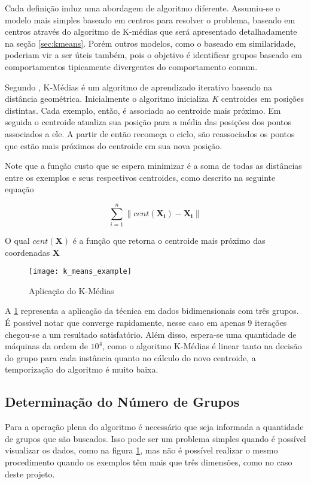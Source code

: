 Cada definição induz uma abordagem de algoritmo diferente. Assumiu-se o modelo mais simples baseado em centros para resolver o problema, baseado em centros através do algoritmo de K-médias que será apresentado detalhadamente na seção \ref{sec:kmeans}. Porém outros modelos, como o baseado em similaridade, poderiam vir a ser úteis também, pois o objetivo é identificar grupos baseado em comportamentos tipicamente divergentes do comportamento comum.

Segundo \citet{witten2011data}, K-Médias é um algoritmo de aprendizado iterativo baseado na distância geométrica. Inicialmente o algoritmo inicializa \textit{K} centroides em posições distintas. Cada exemplo, então, é associado ao centroide mais próximo. Em seguida o centroide atualiza sua posição para a média das posições dos pontos associados a ele. A partir de então recomeça o ciclo, são reassociados os pontos que estão mais próximos do centroide em sua nova posição.

Note que a função custo que se espera minimizar é a soma de todas as distâncias entre os exemplos e seus respectivos centroides, como descrito na seguinte equação

\[
\sum_{i=1}^{n} \lVert cent(\mathbf{X_{i}}) - \mathbf{X_{i}} \rVert
\]

O qual \(cent(\mathbf{X})\) é a função que retorna o centroide mais próximo das coordenadas \(\mathbf{X}\)

\begin{figure}
\texttt{[image: k\_means\_example]}
\caption[Aplicação do K-Médias]{Aplicação do K-Médias} \label{fig:k_means_example}
\end{figure}

A \ref{fig:k_means_example} representa a aplicação da técnica em dados bidimensionais com três grupos. É possível notar que converge rapidamente, nesse caso em apenas 9 iterações chegou-se a um resultado satisfatório. Além disso, espera-se uma quantidade de máquinas da ordem de \(10^4\), como o algoritmo K-Médias é linear tanto na decisão do grupo para cada instância quanto no cálculo do novo centroide, a temporização do algoritmo é muito baixa.

\subsection{Determinação do Número de Grupos}

Para a operação plena do algoritmo é necessário que seja informada a quantidade de grupos que são buscados. Isso pode ser um problema simples quando é possível visualizar os dados, como na figura \ref{fig:k_means_example}, mas não é possível realizar o mesmo procedimento quando os exemplos têm mais que três dimensões, como no caso deste projeto.

